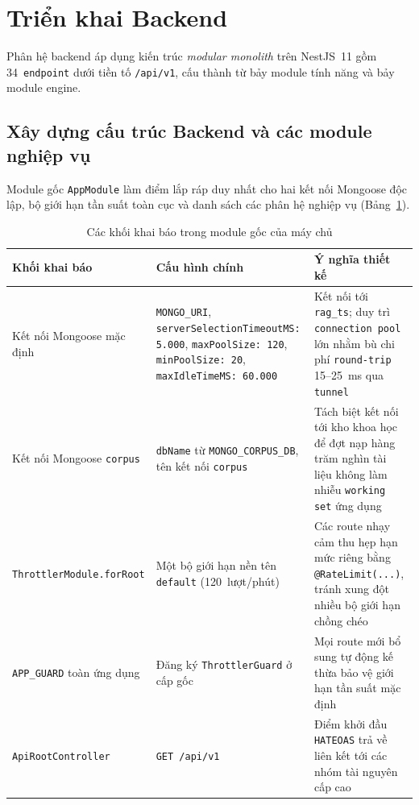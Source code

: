 \section{Triển khai Backend}
\label{sec:trien-khai-backend}

Phân hệ backend áp dụng kiến trúc \textit{modular monolith} trên NestJS~11 gồm 34~\texttt{endpoint} dưới tiền tố \texttt{/api/v1}, cấu thành từ bảy module tính năng và bảy module engine.

\subsection{Xây dựng cấu trúc Backend và các module nghiệp vụ}
\label{subsec:backend-modules}

Module gốc \texttt{AppModule} làm điểm lắp ráp duy nhất cho hai kết nối Mongoose độc lập, bộ giới hạn tần suất toàn cục và danh sách các phân hệ nghiệp vụ (Bảng~\ref{tab:app-module-blocks}).

\begin{table}[htbp]
\centering
\caption{Các khối khai báo trong module gốc của máy chủ}
\label{tab:app-module-blocks}
\footnotesize
\setlength{\tabcolsep}{4pt}
\begin{tabularx}{\textwidth}{
  >{\raggedright\arraybackslash}p{3.4cm}
  >{\raggedright\arraybackslash}p{4.8cm}
  >{\raggedright\arraybackslash}X
}
\toprule
\textbf{Khối khai báo} & \textbf{Cấu hình chính} & \textbf{Ý nghĩa thiết kế} \\
\midrule
Kết nối Mongoose mặc định & \texttt{MONGO\_\allowbreak{}URI}, \texttt{serverSelection\allowbreak{}TimeoutMS:\allowbreak{} 5.000}, \texttt{maxPoolSize:\allowbreak{} 120}, \texttt{minPoolSize:\allowbreak{} 20}, \texttt{maxIdleTimeMS:\allowbreak{} 60.000} & Kết nối tới \texttt{rag\_ts}; duy trì \texttt{connection pool} lớn nhằm bù chi phí \texttt{round-trip} 15--25~ms qua \texttt{tunnel} \\
\midrule
Kết nối Mongoose \texttt{corpus} & \texttt{dbName} từ \texttt{MONGO\_\allowbreak{}CORPUS\_\allowbreak{}DB}, tên kết nối \texttt{corpus} & Tách biệt kết nối tới kho khoa học để đợt nạp hàng trăm nghìn tài liệu không làm nhiễu \texttt{working set} ứng dụng \\
\midrule
\texttt{ThrottlerModule.\allowbreak{}forRoot} & Một bộ giới hạn nền tên \texttt{default} (120~lượt/phút) & Các route nhạy cảm thu hẹp hạn mức riêng bằng \texttt{@RateLimit(...)}, tránh xung đột nhiều bộ giới hạn chồng chéo \\
\midrule
\texttt{APP\_GUARD} toàn ứng dụng & Đăng ký \texttt{ThrottlerGuard} ở cấp gốc & Mọi route mới bổ sung tự động kế thừa bảo vệ giới hạn tần suất mặc định \\
\midrule
\texttt{ApiRootController} & \texttt{GET /api/v1} & Điểm khởi đầu \texttt{HATEOAS} trả về liên kết tới các nhóm tài nguyên cấp cao \\
\bottomrule
\end{tabularx}
\end{table}

